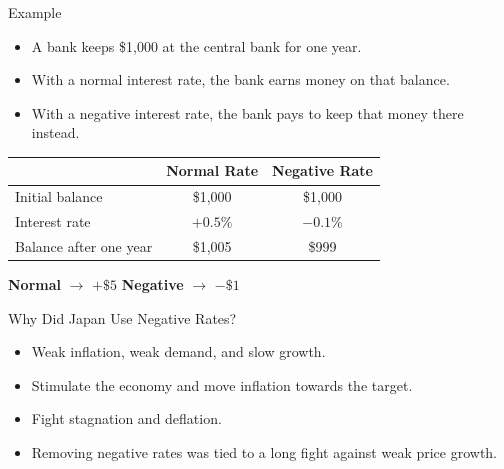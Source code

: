 \documentclass{beamer}
\begin{document}

\begin{frame}[t]{Example}

\begin{itemize}
    \setlength{\itemsep}{0.8em}
    
    \item A bank keeps \$1{,}000 at the central bank for one year.
    
    \item With a normal interest rate, the bank earns money on that balance.
    
    \item With a negative interest rate, the bank pays to keep that money there instead.
    
\end{itemize}

\vspace{0.6em}

\begin{center}
\begin{tabular}{lcc}
\toprule
 & \textbf{Normal Rate} & \textbf{Negative Rate} \\
\midrule
Initial balance & \$1{,}000 & \$1{,}000 \\
Interest rate & \(+0.5\%\) & \(-0.1\%\) \\
Balance after one year & \$1{,}005 & \$999 \\
\bottomrule
\end{tabular}
\end{center}

\vspace{0.6em}

\begin{center}
\textbf{Normal} \(\rightarrow\) \(+\$5\) \qquad\qquad
\textbf{Negative} \(\rightarrow\) \(-\$1\)
\end{center}

\end{frame}


\begin{frame}[t]{Why Did Japan Use Negative Rates?}

\begin{itemize}
    \setlength{\itemsep}{0.9em}
    
    \item Weak inflation, weak demand, and slow growth.
    
    \item Stimulate the economy and move inflation towards the target.
    
    \item Fight stagnation and deflation.
        
    \item Removing negative rates was tied to a long fight against weak price growth.
    
\end{itemize}

\end{frame}
\end{document}
